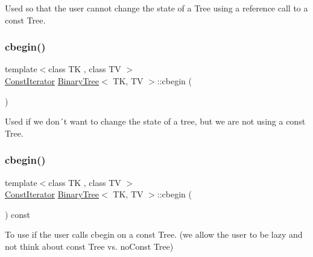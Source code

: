 Used so that the user cannot change the state of a Tree using a reference call to a const Tree. \mbox{\label{classBinaryTree_afc1bfd2d748acb391605ffcf8c86439d}} 
\subsubsection{\texorpdfstring{cbegin()}{cbegin()}\hspace{0.1cm}{\footnotesize\ttfamily [1/2]}}
{\footnotesize\ttfamily template$<$class TK , class TV $>$ \\
\mbox{\hyperlink{classBinaryTree_1_1ConstIterator}{Const\+Iterator}} \mbox{\hyperlink{classBinaryTree}{Binary\+Tree}}$<$ TK, TV $>$\+::cbegin (\begin{DoxyParamCaption}{ }\end{DoxyParamCaption})\hspace{0.3cm}{\ttfamily [inline]}}

Used if we don´t want to change the state of a tree, but we are not using a const Tree. \mbox{\label{classBinaryTree_a70ad506f00c666f7e3b26f78e66709c7}} 
\subsubsection{\texorpdfstring{cbegin()}{cbegin()}\hspace{0.1cm}{\footnotesize\ttfamily [2/2]}}
{\footnotesize\ttfamily template$<$class TK , class TV $>$ \\
\mbox{\hyperlink{classBinaryTree_1_1ConstIterator}{Const\+Iterator}} \mbox{\hyperlink{classBinaryTree}{Binary\+Tree}}$<$ TK, TV $>$\+::cbegin (\begin{DoxyParamCaption}{ }\end{DoxyParamCaption}) const\hspace{0.3cm}{\ttfamily [inline]}}

To use if the user calls cbegin on a const Tree. (we allow the user to be lazy and not think about const Tree vs. no\+Const Tree) \mbox{\label{classBinaryTree_a8e35d6be680d9fbd5129361337ada338}} 
